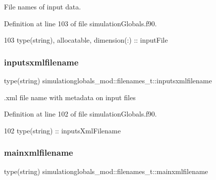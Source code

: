 File names of input data. 



Definition at line 103 of file simulation\+Globals.\+f90.


\begin{DoxyCode}
103         \textcolor{keywordtype}{type}(string), \textcolor{keywordtype}{allocatable}, \textcolor{keywordtype}{dimension(:)} :: inputFile
\end{DoxyCode}
\mbox{\label{structsimulationglobals__mod_1_1filenames__t_aef0d56123bd40e7f6a485680bad46345}} 
\subsubsection{\texorpdfstring{inputsxmlfilename}{inputsxmlfilename}}
{\footnotesize\ttfamily type(string) simulationglobals\+\_\+mod\+::filenames\+\_\+t\+::inputsxmlfilename\hspace{0.3cm}{\ttfamily [private]}}



.xml file name with metadata on input files 



Definition at line 102 of file simulation\+Globals.\+f90.


\begin{DoxyCode}
102         \textcolor{keywordtype}{type}(string) :: inputsXmlFilename
\end{DoxyCode}
\mbox{\label{structsimulationglobals__mod_1_1filenames__t_a5af6fa9ef520239ea544e0241a03259d}} 
\subsubsection{\texorpdfstring{mainxmlfilename}{mainxmlfilename}}
{\footnotesize\ttfamily type(string) simulationglobals\+\_\+mod\+::filenames\+\_\+t\+::mainxmlfilename\hspace{0.3cm}{\ttfamily [private]}}



